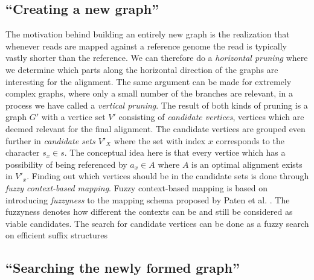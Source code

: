 \documentclass[thesis.tex]{subfiles}
\begin{document}
\subsection{``Creating a new graph''}
The motivation behind building an entirely new graph is the realization that whenever reads are mapped against a reference genome the read is typically vastly shorter than the reference. We can therefore do a \textit{horizontal pruning} where we determine which parts along the horizontal direction of the graphs are interesting for the alignment. The same argument can be made for extremely complex graphs, where only a small number of the branches are relevant, in a process we have called a \textit{vertical pruning}. The result of both kinds of pruning is a graph $G'$ with a vertice set $V'$ consisting of \textit{candidate vertices}, vertices which are deemed relevant for the final alignment. The candidate vertices are grouped even further in \textit{candidate  sets $V'_X$} where the set with index $x$ corresponds to the character $s_x \in s$. The conceptual idea here is that every vertice which has a possibility of being referenced by $a_x \in A$ where $A$ is an optimal alignment exists in $V'_x$. Finding out which vertices should be in the candidate sets is done through \textit{fuzzy context-based mapping}. Fuzzy context-based mapping is based on introducing \textit{fuzzyness} to the mapping schema proposed by Paten et al. \cite{mapping_to_a_reference_genome_structure}. The fuzzyness denotes how different the contexts can be and still be considered as viable candidates. The search for candidate vertices can be done as a fuzzy search on efficient suffix structures 
\subsection{``Searching the newly formed graph''}
\end{document}
